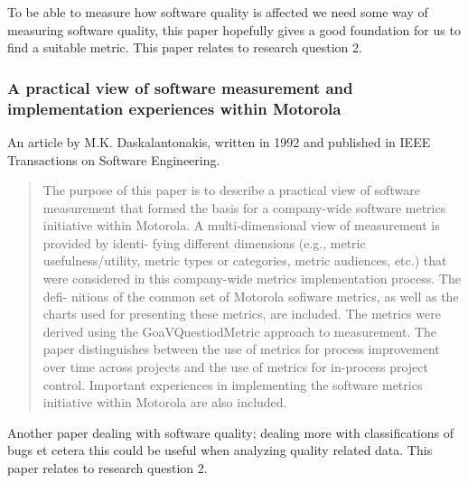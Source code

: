 \documentclass{llncs}
\begin{document}
To be able to measure how software quality is affected we need some
way of measuring software quality, this paper hopefully gives a good
foundation for us to find a suitable metric. This paper relates to
research question 2.

\subsubsection{A practical view of software measurement and
  implementation experiences within Motorola}

An article by M.K. Daskalantonakis, written in 1992 and published in
IEEE Transactions on Software Engineering.

\begin{abstract}
 The purpose of this paper is to describe a practical view of
 software measurement that formed the basis for a company-wide
 software metrics initiative within Motorola. A multi-dimensional
 view of measurement is provided by identi- fying different
 dimensions (e.g., metric usefulness/utility, metric types or
 categories, metric audiences, etc.) that were considered in this
 company-wide metrics implementation process. The defi- nitions of
 the common set of Motorola sofiware metrics, as well as the charts
 used for presenting these metrics, are included. The metrics were
 derived using the GoaVQuestiodMetric approach to measurement. The
 paper distinguishes between the use of metrics for process
 improvement over time across projects and the use of metrics for
 in-process project control. Important experiences in implementing
 the software metrics initiative within Motorola are also included.
\end{abstract}

Another paper dealing with software quality; dealing more with
classifications of bugs et cetera this could be useful when analyzing
quality related data. This paper relates to research question 2.
\end{document}
